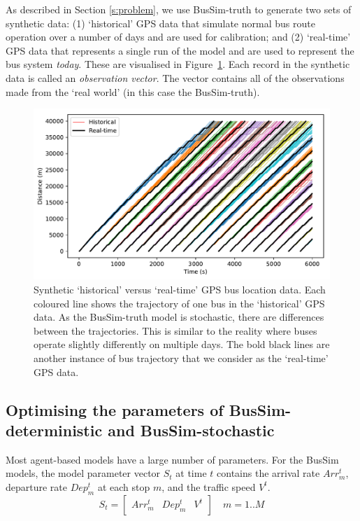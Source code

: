 As described in Section \ref{s:problem}, we use BusSim-truth to generate two sets of synthetic data: (1) `historical' GPS data that simulate normal bus route operation over a number of days and are used for calibration; and (2) `real-time' GPS data that represents a single run of the model and are used to represent the bus system \textit{today}. These are visualised in Figure~\ref{fig:historical_realtime}. Each record in the synthetic data is called an \textit{observation vector}. The vector contains all of the observations made from the `real world' (in this case the BusSim-truth).

\begin{figure}[h]
	\centering
	\includegraphics[width=1\textwidth]{Figures/Fig_spacetime_dynamic.pdf}
	\caption{Synthetic `historical' versus `real-time' GPS bus location data. Each coloured line shows the trajectory of one bus in the `historical' GPS data. As the BusSim-truth model is stochastic, there are differences between the trajectories. This is similar to the reality where buses operate slightly differently on multiple days. The bold black lines are another instance of bus trajectory that we consider as the `real-time' GPS data.  }
	\label{fig:historical_realtime}
\end{figure}


\subsection{Optimising the parameters of BusSim-deterministic and BusSim-stochastic}
\label{s:calibration}

Most agent-based models have a large number of parameters. For the BusSim models, the model parameter vector $S_t$ at time $t$ contains the arrival rate $Arr_m^t$, departure rate $Dep_m^t$ at each stop $m$, and the traffic speed $V^t$. 
\begin{equation}
  S_t  = \left[ \begin{array}{ccc}
Arr_m^t & Dep_m^t & V^t  
\end{array} \right] \quad m=1..M 
\label{eq:S}
\end{equation} 

